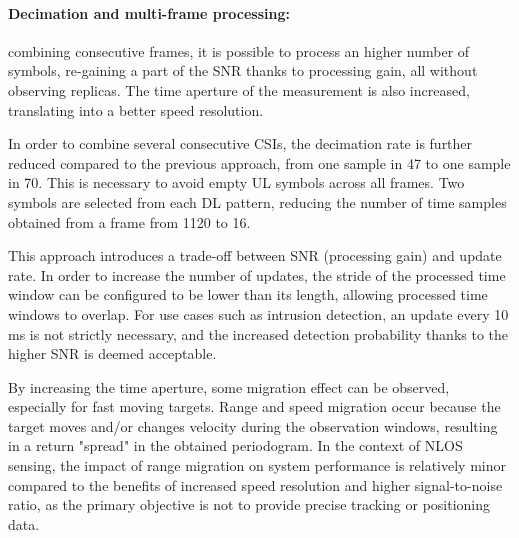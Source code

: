      \paragraph{Decimation and multi-frame processing:}
     combining consecutive frames, it is possible to process an higher number of symbols, re-gaining a part of the SNR thanks to processing gain, all without observing replicas. The time aperture of the measurement is also increased, translating into a better speed resolution.
     
	 In order to combine several consecutive CSIs, the decimation rate is further reduced compared to the previous approach, from one sample in 47 to one sample in 70. 
	 This is necessary to avoid empty UL symbols across all frames. 
	 Two symbols are selected from each DL pattern, reducing the number of time samples obtained from a frame from 1120 to 16. 

     This approach introduces a trade-off between SNR (processing gain) and update rate.
     In order to increase the number of updates, the stride of the processed time window can be configured to be lower than its length, allowing processed time windows to overlap.
     For use cases such as intrusion detection, an update every 10 ms is not strictly necessary, and the increased detection probability thanks to the higher SNR is deemed acceptable.
      
     By increasing the time aperture, some migration effect can be observed, especially for fast moving targets. 
     Range and speed migration occur because the target moves and/or changes velocity during the observation windows, resulting in a return "spread" in the obtained periodogram.
     In the context of NLOS sensing, the impact of range migration on system performance is relatively minor compared to the benefits of increased speed resolution and higher signal-to-noise ratio, as the primary objective is not to provide precise tracking or positioning data.
	
